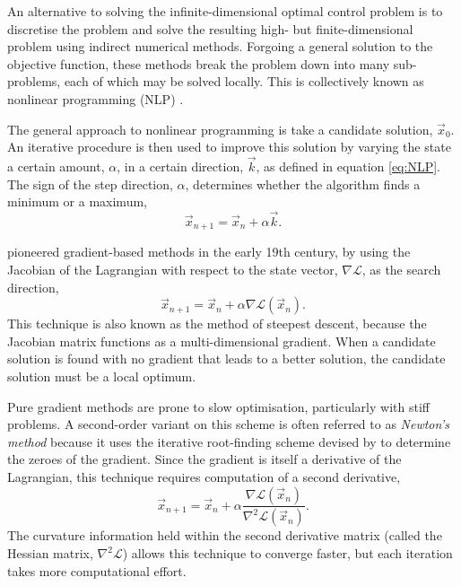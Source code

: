 An alternative to solving the infinite-dimensional optimal control problem is to discretise the problem and solve the resulting high- but finite-dimensional problem using indirect numerical methods. Forgoing a general solution to the objective function, these methods break the problem down into many sub-problems, each of which may be solved locally. This is collectively known as nonlinear programming (NLP) \parencite{Betts1998}. 

The general approach to nonlinear programming is take a candidate solution, $\vec{x}_0$. An iterative procedure is then used to improve this solution by varying the state a certain amount, $\alpha$, in a certain direction, $\vec{k}$, as defined in equation \eqref{eq:NLP}. The sign of the step direction, $\alpha$, determines whether the algorithm finds a minimum or a maximum,
\begin{equation} \label{eq:NLP}
\vec{x}_{n+1}=\vec{x}_n+\alpha\vec{k}.
\end{equation}

\textcite{Gauss1827} pioneered gradient-based methods in the early 19th century, by using the Jacobian of the Lagrangian with respect to the state vector, $\nabla\mathcal{L}$, as the search direction,
\begin{equation} \label{eq:gradient-method}
\vec{x}_{n+1}=\vec{x}_n + \alpha\nabla\mathcal{L}(\vec{x}_n).
\end{equation}
This technique is also known as the method of steepest descent, because the Jacobian matrix functions as a multi-dimensional gradient. When a candidate solution is found with no gradient that leads to a better solution, the candidate solution must be a local optimum.

Pure gradient methods are prone to slow optimisation, particularly with stiff problems. %
A second-order variant on this scheme is often referred to as \emph{Newton's method} because it uses the iterative root-finding scheme devised by \textcite{Newton1711, Newton1736} to determine the zeroes of the gradient. Since the gradient is itself a derivative of the Lagrangian, this technique requires computation of a second derivative, 
\begin{equation} \label{eq:newtons-method}
\vec{x}_{n+1}=\vec{x}_n + \alpha\frac{\nabla\mathcal{L}(\vec{x}_n)}{\nabla^2\mathcal{L}(\vec{x}_n)}.
\end{equation}
The curvature information held within the second derivative matrix (called the Hessian matrix, $\nabla^2\mathcal{L}$) allows this technique to converge faster, but each iteration takes more computational effort.

